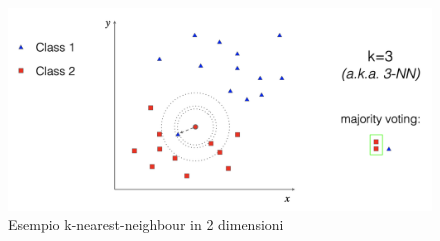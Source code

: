 \begin{figure}
    \centering
    \includegraphics[width=\textwidth]{immagini/knn.png}
    \caption{Esempio k-nearest-neighbour in 2 dimensioni}
    \label{fig:knn}
\end{figure}

